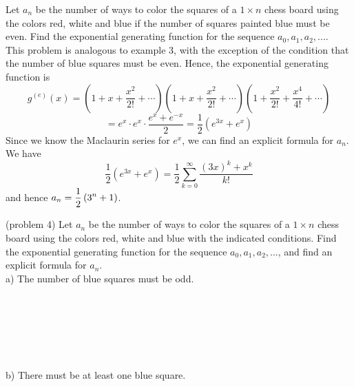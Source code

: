 \documentclass[handout]{ximera}
\begin{document}
\begin{example}[example 4]
Let $a_n$ be the number of ways to color the squares of a $1 \times n$ chess board using the 
colors red, white and blue if the number of squares painted blue must be even. Find the exponential generating 
function for the sequence $a_0 , a_1, a_2, ...$.\\
This problem is analogous to example 3, with the exception of the condition that the number of blue squares must be even.
Hence, the exponential generating function is
\[
g^{(e)}(x) = \left(1 + x + \frac{x^2}{2!} + \cdots \right)\left(1 + x + \frac{x^2}{2!} + \cdots \right)
\left(1 + \frac{x^2}{2!} +  \frac{x^4}{4!} + \cdots \right)
\]
\[
= e^x \cdot e^x \cdot \frac{e^x + e^{-x}}{2} = \frac12 \left(e^{3x} + e^x \right)
\]
Since we know the Maclaurin series for $e^x$, we can find an explicit formula for $a_n$. We have
\[
\frac12 \left(e^{3x} + e^x \right) = \frac12 \sum_{k = 0}^\infty \frac{(3x)^k + x^k}{k!}
\]
and hence $a_n = \displaystyle \frac12 \left(3^n + 1\right)$.
\end{example}


\begin{problem}(problem 4)
Let $a_n$ be the number of ways to color the squares of a $1 \times n$ chess board using the 
colors red, white and blue with the indicated conditions. Find the exponential generating function for the sequence $a_0 , a_1, a_2, ...$,
and find an explicit formula for $a_n$.\\
a) The number of blue squares must be odd.
\begin{multipleChoice}
\\
\\
\end{multipleChoice}

\begin{multipleChoice}
\\
\\
\end{multipleChoice}

b) There must be at least one blue square.
\begin{multipleChoice}
\\
\\
\end{multipleChoice}

\begin{multipleChoice}
\\
\\
\end{multipleChoice}
\end{problem}
\end{document}
